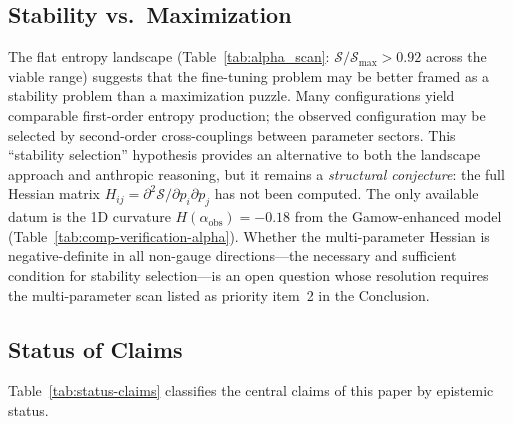 \documentclass[12pt,a4paper]{article}
\theoremstyle{remark}
\begin{document}
\subsection{Stability vs.\ Maximization}

The flat entropy landscape (Table~\ref{tab:alpha_scan}: $\mathcal{S}/\mathcal{S}_{\max} > 0.92$ across the viable range) suggests that the fine-tuning problem may be better framed as a stability problem than a maximization puzzle. Many configurations yield comparable first-order entropy production; the observed configuration may be selected by second-order cross-couplings between parameter sectors. This ``stability selection'' hypothesis provides an alternative to both the landscape approach and anthropic reasoning, but it remains a \emph{structural conjecture}: the full Hessian matrix $H_{ij} = \partial^2 \mathcal{S}/\partial p_i \partial p_j$ has not been computed. The only available datum is the 1D curvature $H(\alpha_{\text{obs}}) = -0.18$ from the Gamow-enhanced model (Table~\ref{tab:comp-verification-alpha}). Whether the multi-parameter Hessian is negative-definite in all non-gauge directions---the necessary and sufficient condition for stability selection---is an open question whose resolution requires the multi-parameter scan listed as priority item~2 in the Conclusion.

\subsection{Status of Claims}

Table~\ref{tab:status-claims} classifies the central claims of this paper by epistemic status.
\end{document}
